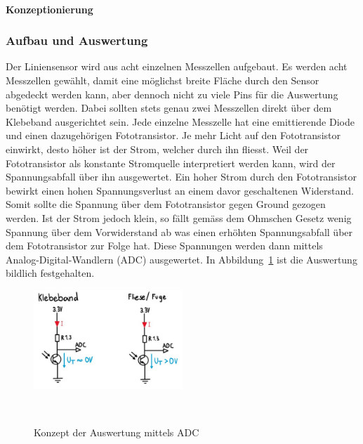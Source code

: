 \documentclass[main.tex]{subfiles} %
\begin{document}
\paragraph{Konzeptionierung}

\subsubsection{Aufbau und Auswertung}
Der Liniensensor wird aus acht einzelnen Messzellen aufgebaut. Es werden acht Messzellen
gewählt, damit eine möglichst breite Fläche durch den Sensor abgedeckt werden kann, aber
dennoch nicht zu viele Pins für die Auswertung benötigt werden. Dabei sollten stets genau
zwei Messzellen direkt über dem Klebeband ausgerichtet sein. Jede einzelne Messzelle hat 
eine emittierende Diode und einen dazugehörigen Fototransistor. Je mehr Licht auf den 
Fototransistor einwirkt, desto höher ist der Strom, welcher durch ihn fliesst. Weil der 
Fototransistor als konstante Stromquelle interpretiert werden kann, wird der Spannungsabfall
über ihn ausgewertet. Ein hoher Strom durch den Fototransistor bewirkt einen hohen 
Spannungsverlust an einem davor geschaltenen Widerstand. Somit sollte die Spannung über dem
Fototransistor gegen Ground gezogen werden. Ist der Strom jedoch klein,
so fällt gemäss dem Ohmschen Gesetz wenig Spannung über dem Vorwiderstand ab was einen erhöhten
Spannungsabfall über dem Fototransistor zur Folge hat. Diese Spannungen werden dann mittels
Analog-Digital-Wandlern (ADC) ausgewertet. In Abbildung~\ref{fig:Auswertung_Liniensensor1} ist 
die Auswertung bildlich festgehalten.

\begin{figure}[H]
    \centering
    \includegraphics[width=0.5\textwidth]{fig_Strecke_Tracken/Auswertung_Liniensensor.pdf}
    \caption{Konzept der Auswertung mittels ADC}~\label{fig:Auswertung_Liniensensor1}
\end{figure}

\end{document}

